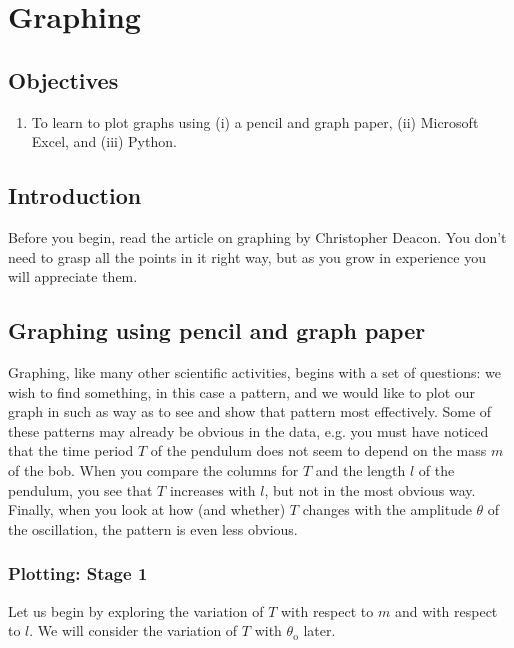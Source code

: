 
\chapter{Graphing}
\section{Objectives}

\begin{enumerate}
    \item To learn to plot graphs using (i) a pencil and graph paper, (ii) Microsoft Excel, and (iii) Python.
\end{enumerate}

\section{Introduction}
Before you begin, read the article on graphing by Christopher Deacon. You don't need to grasp all the points in it right way, but as you grow in experience you will appreciate them.

\section{Graphing using pencil and graph paper}
Graphing, like many other scientific activities, begins with a set of questions: we wish to find something, in this case a pattern, and we would like to plot our graph in such as way as to see and show that pattern most effectively. Some of these patterns may already be obvious in the data, e.g. you must have noticed that the time period $T$ of the pendulum does not seem to depend on the mass $m$ of the bob. When you compare the columns for $T$ and the length $l$ of the pendulum, you see that $T$ increases with $l$, but not in the most obvious way. Finally, when you look at how (and whether) $T$ changes with the amplitude $\theta$ of the oscillation, the pattern is even less obvious. 

\subsection{Plotting: Stage 1}
Let us begin by exploring the variation of $T$ with respect to $m$ and with respect to $l$. We will consider the variation of $T$ with $\theta_\text{o}$ later. 

